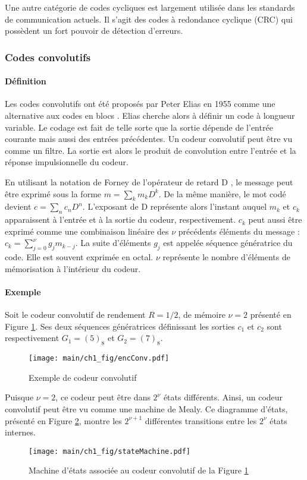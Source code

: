 Une autre catégorie de codes cycliques est largement utilisée dans les standards de communication actuels. Il s'agit des 
codes à redondance cyclique (CRC) \cite{crc} qui possèdent un fort pouvoir de détection d'erreurs.

\subsubsection{Codes convolutifs}
\paragraph*{Définition}
Les codes convolutifs ont été proposés par Peter Elias en 1955 comme une alternative aux codes en blocs \cite{elias}. 
Elias cherche alors à définir un code à longueur variable. Le codage est fait de telle sorte que la sortie dépende de 
l'entrée courante mais aussi des entrées précédentes. Un codeur convolutif peut être vu comme un filtre. La sortie 
est alors le produit de convolution entre l'entrée et la réponse impulsionnelle du codeur. 

En utilisant la notation de Forney de l'opérateur de retard D \cite{forney1970convolutional}, le message peut être exprimé 
sous la forme $m=\sum_k m_kD^k$. De la même manière, le mot codé devient $c=\sum_n c_nD^n$. L'exposant de D représente 
alors l'instant auquel $m_k$ et $c_k$ apparaissent à l'entrée et à la sortie du codeur, respectivement. $c_k$ peut aussi 
être exprimé comme une combinaison linéaire des $\nu$ précédents éléments du message : $c_k = \sum\limits_{j=0}^\nu g_jm_{k-j}$.
La suite d'éléments $g_j$ est appelée séquence génératrice du code. Elle est souvent exprimée en octal. $\nu$ représente le 
nombre d'éléments de mémorisation à l'intérieur du codeur.

\paragraph*{Exemple}
Soit le codeur convolutif de rendement $R=1/2$, de mémoire $\nu = 2$ présenté en Figure \ref{fig:encConv}. Ses deux 
séquences génératrices définissant les sorties $c_1$ et $c_2$ sont respectivement $G_1 = (5)_8$ et $G_2 = (7)_8$.
\begin{figure}[!h]
	\centering
	\texttt{[image: main/ch1\_fig/encConv.pdf]}
	\caption{\label{fig:encConv} Exemple de codeur convolutif}
\end{figure}
Puisque $\nu = 2$, ce codeur peut être dans $2^\nu$ états différents. Ainsi, un codeur convolutif peut être vu comme une 
machine de Mealy. Ce diagramme d'états, présenté en Figure \ref{fig:stateMachine}, montre les  $2^{\nu+1}$ 
différentes transitions entre les $2^{\nu}$ états internes. 
\begin{figure}[!h]
	\centering
	\texttt{[image: main/ch1\_fig/stateMachine.pdf]}
	\caption{\label{fig:stateMachine} Machine d'états associée au codeur convolutif de la Figure \ref{fig:encConv}}
\end{figure}

